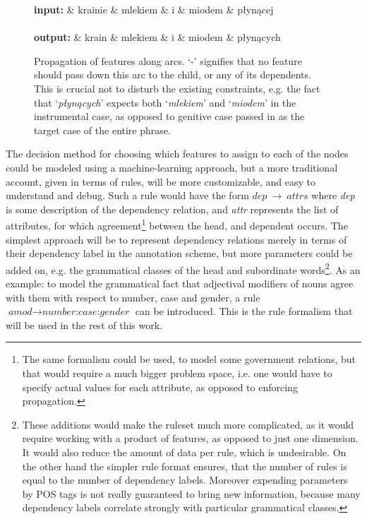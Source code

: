 \documentclass[12pt]{article}
\newcommand{\inlinegloss}[1]{`\textit{#1}'}
\begin{document}
\begin{figure}[H]
\centering
\begin{dependency}[edge slant=0, label style = {draw=white}]
\begin{deptext}[column sep=0.5cm]
\textbf{input:} \& krainie \& mlekiem  \& i \& miodem \& płynącej \\
\\
\hline
\textbf{output:} \& krain \& mlekiem  \& i \& miodem \& płynących \\
\end{deptext}
\end{dependency}
	\caption{Propagation of features along arcs. `-' signifies that no feature should pass down this arc to the child, or any of its dependents. This is crucial not to disturb the existing constraints, e.g. the fact that \inlinegloss{płynących} expects both \inlinegloss{mlekiem} and \inlinegloss{miodem} in the instrumental case, as opposed to genitive case passed in as the target case of the entire phrase.} \label{tree:propagation}
\end{figure}

The decision method for choosing which features to assign to each of the nodes could be modeled using a machine-learning approach, but a more traditional account, given in terms of rules, will be more customizable, and easy to understand and debug. Such a rule would have the form {$\textit{dep}~\rightarrow~attrs$} where {\textit{dep}} is some description of the dependency relation, and \textit{attr} represents the list of attributes, for which agreement\footnote{The same formalism could be used, to model some government relations, but that would require a much bigger problem space, i.e. one would have to specify actual values for each attribute, as opposed to enforcing propagation.} between the head, and dependent occurs. The simplest approach will be to represent dependency relations merely in terms of their dependency label in the annotation scheme, but more parameters could be added on, e.g. the grammatical classes of the head and subordinate words\footnote{These additions would make the ruleset much more complicated, as it would require working with a product of features, as opposed to just one dimension. It would also reduce the amount of data per rule, which is undesirable. On the other hand the simpler rule format ensures, that the number of rules is equal to the number of dependency labels. Moreover expending parameters by POS tags is not really guaranteed to bring new information, because many dependency labels correlate strongly with particular grammatical classes.}. As an example: to model the grammatical fact that adjectival modifiers of nouns agree with them with respect to number, case and gender, a rule {$\textit{amod} \rightarrow \textit{number:case:gender}$} can be introduced. This is the rule formalism that will be used in the rest of this work.
\end{document}
